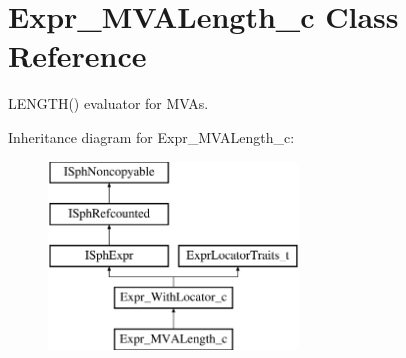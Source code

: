 \hypertarget{classExpr__MVALength__c}{\section{Expr\-\_\-\-M\-V\-A\-Length\-\_\-c Class Reference}
\label{classExpr__MVALength__c}
}


L\-E\-N\-G\-T\-H() evaluator for M\-V\-As.  


Inheritance diagram for Expr\-\_\-\-M\-V\-A\-Length\-\_\-c\-:\begin{figure}[H]
\begin{center}
\leavevmode
\includegraphics[height=5.000000cm]{classExpr__MVALength__c}
\end{center}
\end{figure}
